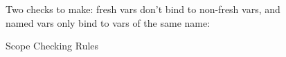 \begin{figure}
Two checks to make: fresh vars don't bind to non-fresh vars, and named
vars only bind to vars of the same name:
\begin{multicols}{3}
\end{multicols}

\caption{Scope Checking Rules}
\label{fig:scope}
\end{figure}
